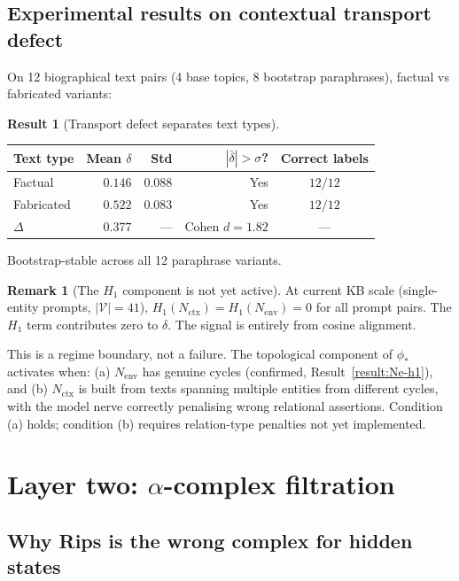 \documentclass[11pt]{amsart}
\theoremstyle{definition}
\newtheorem{remark}[theorem]{Remark}
\newtheorem{result}[theorem]{Result}
\newcommand{\Nctx}{N_{\mathrm{ctx}}}
\newcommand{\Nenv}{N_{\mathrm{env}}}
\begin{document}
\subsection{Experimental results on contextual transport defect}

On 12 biographical text pairs (4 base topics, 8 bootstrap paraphrases),
factual vs fabricated variants:

\begin{result}[Transport defect separates text types]
\label{result:defect}
\begin{center}
\begin{tabular}{@{}lrrrc@{}}
\toprule
Text type & Mean $\delta$ & Std & $|\bar\delta| > \sigma$? & Correct labels \\
\midrule
Factual & $0.146$ & $0.088$ & Yes & $12/12$ \\
Fabricated & $0.522$ & $0.083$ & Yes & $12/12$ \\
\midrule
$\Delta$ & $0.377$ & --- & Cohen $d = 1.82$ & --- \\
\bottomrule
\end{tabular}
\end{center}
Bootstrap-stable across all 12 paraphrase variants.
\end{result}

\begin{remark}[The $H_1$ component is not yet active]
At current KB scale (single-entity prompts, $|\mathcal{V}| = 41$),
$H_1(\Nctx) = H_1(\Nenv) = 0$ for all prompt pairs.
The $H_1$ term contributes zero to $\delta$.
The signal is entirely from cosine alignment.

This is a regime boundary, not a failure.
The topological component of $\phi_*$ activates when:
(a) $\Nenv$ has genuine cycles (confirmed, Result~\ref{result:Ne-h1}),
and (b) $\Nctx$ is built from texts spanning multiple entities
from different cycles, with the model nerve correctly penalising
wrong relational assertions.
Condition (a) holds; condition (b) requires relation-type penalties
not yet implemented.
\end{remark}

\section{Layer two: $\alpha$-complex filtration}
\label{sec:alpha}

\subsection{Why Rips is the wrong complex for hidden states}
\end{document}
